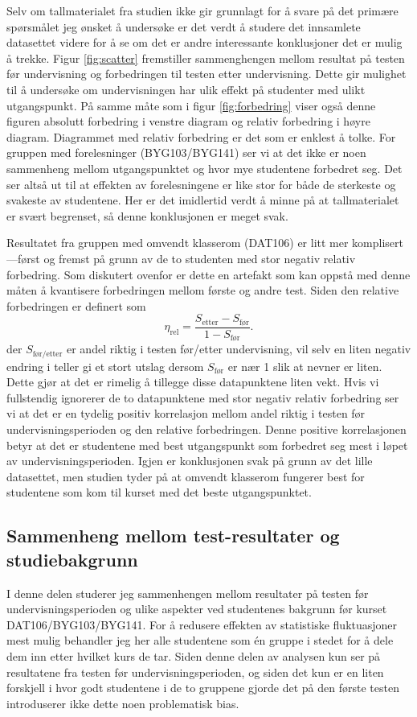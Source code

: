 \documentclass[a4paper,norsk,12pt]{article}
\begin{document}
Selv om tallmaterialet fra studien ikke gir grunnlagt for å svare på det primære spørsmålet jeg ønsket å undersøke er det verdt å studere det innsamlete datasettet videre for å se om det er andre interessante konklusjoner det er mulig å trekke. Figur \ref{fig:scatter} fremstiller sammenghengen mellom resultat på testen før undervisning og forbedringen til testen etter undervisning. Dette gir mulighet til å undersøke om undervisningen har ulik effekt på studenter med ulikt utgangspunkt. På samme måte som i figur \ref{fig:forbedring} viser også denne figuren absolutt forbedring i venstre diagram og relativ forbedring i høyre diagram. Diagrammet med relativ forbedring er det som er enklest å tolke. For gruppen med forelesninger (BYG103/BYG141) ser vi at det ikke er noen sammenheng mellom utgangspunktet og hvor mye studentene forbedret seg. Det ser altså ut til at effekten av forelesningene er like stor for både de sterkeste og svakeste av studentene. Her er det imidlertid verdt å minne på at tallmaterialet er svært begrenset, så denne konklusjonen er meget svak.

Resultatet fra gruppen med omvendt klasserom (DAT106) er litt mer komplisert---først og fremst på grunn av de to studenten med stor negativ relativ forbedring. Som diskutert ovenfor er dette en artefakt som kan oppstå med denne måten å kvantisere forbedringen mellom første og andre test. Siden den relative forbedringen er definert som 
\begin{displaymath}
	\eta_\text{rel} = \frac{S_\text{etter}-S_\text{før}}{1 - S_\text{før}}.
\end{displaymath}
der $S_\text{før/etter}$ er andel riktig i testen før/etter undervisning, vil selv en liten negativ endring i teller gi et stort utslag dersom $S_\text{før}$ er nær 1 slik at nevner er liten. Dette gjør at det er rimelig å tillegge disse datapunktene liten vekt. Hvis vi fullstendig ignorerer de to datapunktene med stor negativ relativ forbedring ser vi at det er en tydelig positiv korrelasjon mellom andel riktig i testen før undervisningsperioden og den relative forbedringen. Denne positive korrelasjonen betyr at det er studentene med best utgangspunkt som forbedret seg mest i løpet av undervisningsperioden. Igjen er konklusjonen svak på grunn av det lille datasettet, men studien tyder på at omvendt klasserom fungerer best for studentene som kom til kurset med det beste utgangspunktet. 

\subsection{Sammenheng mellom test-resultater og studiebakgrunn}
I denne delen studerer jeg sammenhengen mellom resultater på testen før undervisningsperioden og ulike aspekter ved studentenes bakgrunn før kurset DAT106/BYG103/BYG141. For å redusere effekten av statistiske fluktuasjoner mest mulig behandler jeg her alle studentene som \'en gruppe i stedet for å dele dem inn etter hvilket kurs de tar. Siden denne delen av analysen kun ser på resultatene fra testen før undervisningsperioden, og siden det kun er en liten forskjell i hvor godt studentene i de to gruppene gjorde det på den første testen introduserer ikke dette noen problematisk bias.
\end{document}

